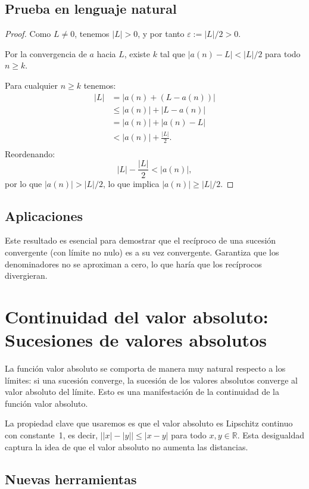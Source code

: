 \subsection{Prueba en lenguaje natural}

\begin{proof}
Como $L \neq 0$, tenemos $|L| > 0$, y por tanto $\varepsilon := |L|/2 > 0$.

Por la convergencia de $a$ hacia $L$, existe $k$ tal que
$|a(n) - L| < |L|/2$ para todo $n \geq k$.

Para cualquier $n \geq k$ tenemos:
\begin{align*}
  |L| &= |a(n) + (L - a(n))|     \\
      &\leq |a(n)| + |L - a(n)|     \\
      &= |a(n)| + |a(n) - L|     \\
      &< |a(n)| + \frac{|L|}{2}. \\
\end{align*}
Reordenando:
\[
  |L| - \frac{|L|}{2} < |a(n)|,
\]
por lo que $|a(n)| > |L|/2$, lo que implica $|a(n)| \geq |L|/2$.
\end{proof}

\subsection{Aplicaciones}

Este resultado es esencial para demostrar que el recíproco de una sucesión
convergente (con límite no nulo) es a su vez convergente. Garantiza que los
denominadores no se aproximan a cero, lo que haría que los recíprocos
divergieran.

\section{Continuidad del valor absoluto: Sucesiones de valores absolutos}

La función valor absoluto se comporta de manera muy natural respecto a los
límites: si una sucesión converge, la sucesión de los valores absolutos
converge al valor absoluto del límite. Esto es una manifestación de la
continuidad de la función valor absoluto.

La propiedad clave que usaremos es que el valor absoluto es Lipschitz
continuo con constante~1, es decir, $\big||x| - |y|\big| \leq |x - y|$ para
todo $x, y \in \mathbb{R}$. Esta desigualdad captura la idea de que el valor
absoluto no aumenta las distancias.

\subsection{Nuevas herramientas}


